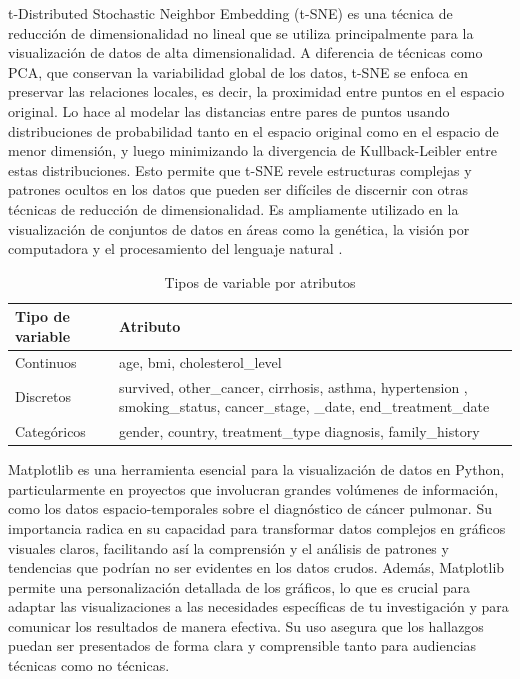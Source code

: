 \documentclass[10pt,journal,compsoc]{IEEEtran}
\begin{document}
t-Distributed Stochastic Neighbor Embedding (t-SNE) es una técnica de reducción de dimensionalidad no lineal que se utiliza principalmente para la visualización de datos de alta dimensionalidad. A diferencia de técnicas como PCA, que conservan la variabilidad global de los datos, t-SNE se enfoca en preservar las relaciones locales, es decir, la proximidad entre puntos en el espacio original. Lo hace al modelar las distancias entre pares de puntos usando distribuciones de probabilidad tanto en el espacio original como en el espacio de menor dimensión, y luego minimizando la divergencia de Kullback-Leibler entre estas distribuciones. Esto permite que t-SNE revele estructuras complejas y patrones ocultos en los datos que pueden ser difíciles de discernir con otras técnicas de reducción de dimensionalidad. Es ampliamente utilizado en la visualización de conjuntos de datos en áreas como la genética, la visión por computadora y el procesamiento del lenguaje natural \cite{maaten2008tsne}.


\begin{table}[h!]
\centering
\begin{tabularx}{\columnwidth}{|l|X|}
\hline
\textbf{Tipo de variable}       & \textbf{Atributo}                 \\ \hline
Continuos                   & age, bmi, cholesterol\_level     \\ \hline
Discretos                   & survived, other\_cancer, cirrhosis, asthma, hypertension , smoking\_status, cancer\_stage, \_date, end\_treatment\_date \\ \hline
Categóricos                 & gender, country, treatment\_type diagnosis, family\_history  \\ \hline
\end{tabularx}
\caption{Tipos de variable por atributos}
\label{tab:tipoVariable}
\end{table}

Matplotlib\cite{hunter2007matplotlib} es una herramienta esencial para la visualización de datos en Python, particularmente en proyectos que involucran grandes volúmenes de información, como los datos espacio-temporales sobre el diagnóstico de cáncer pulmonar. Su importancia radica en su capacidad para transformar datos complejos en gráficos visuales claros, facilitando así la comprensión y el análisis de patrones y tendencias que podrían no ser evidentes en los datos crudos. Además, Matplotlib permite una personalización detallada de los gráficos, lo que es crucial para adaptar las visualizaciones a las necesidades específicas de tu investigación y para comunicar los resultados de manera efectiva. Su uso asegura que los hallazgos puedan ser presentados de forma clara y comprensible tanto para audiencias técnicas como no técnicas.
\end{document}
